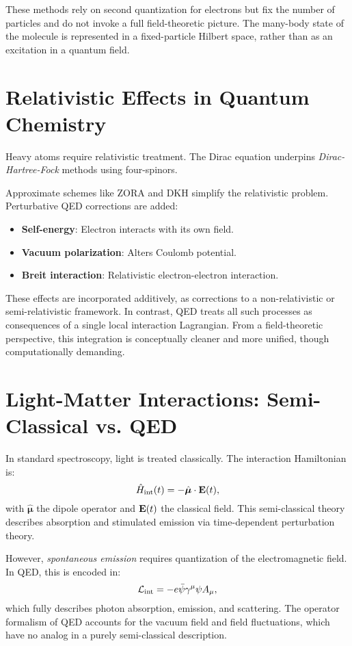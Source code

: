 \medskip

These methods rely on second quantization for electrons but fix the number of particles and do not invoke a full field-theoretic picture. The many-body state of the molecule is represented in a fixed-particle Hilbert space, rather than as an excitation in a quantum field.

\section{Relativistic Effects in Quantum Chemistry}
\label{sec:qc_relativistic}

Heavy atoms require relativistic treatment. The Dirac equation underpins \emph{Dirac-Hartree-Fock} methods using four-spinors.

Approximate schemes like ZORA \cite{vanLenthe1993} and DKH \cite{Douglas1974, Hess1986} simplify the relativistic problem. Perturbative QED corrections are added:
\begin{itemize}
	\item \textbf{Self-energy}: Electron interacts with its own field.
	\item \textbf{Vacuum polarization}: Alters Coulomb potential.
	\item \textbf{Breit interaction}: Relativistic electron-electron interaction.
\end{itemize}

These effects are incorporated additively, as corrections to a non-relativistic or semi-relativistic framework. In contrast, QED treats all such processes as consequences of a single local interaction Lagrangian. From a field-theoretic perspective, this integration is conceptually cleaner and more unified, though computationally demanding.

\section{Light-Matter Interactions: Semi-Classical vs. QED}
\label{sec:qc_light_matter}

In standard spectroscopy, light is treated classically. The interaction Hamiltonian is:
\[
\hat{H}_{\text{int}}(t) = - \hat{\boldsymbol{\mu}} \cdot \vb{E}(t),
\]
with \(\hat{\boldsymbol{\mu}}\) the dipole operator and \(\vb{E}(t)\) the classical field. This semi-classical theory describes absorption and stimulated emission via time-dependent perturbation theory.

However, \emph{spontaneous emission} requires quantization of the electromagnetic field. In QED, this is encoded in:
\[
\mathcal{L}_{\text{int}} = -e \bar{\psi} \gamma^\mu \psi A_\mu,
\]
which fully describes photon absorption, emission, and scattering. The operator formalism of QED accounts for the vacuum field and field fluctuations, which have no analog in a purely semi-classical description.

